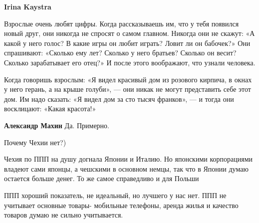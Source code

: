 \begin{itemize}
\begin{itemize}
 
\textbf{Irina Kaystra}

Взрослые очень любят цифры. Когда рассказываешь им, что у тебя появился новый
друг, они никогда не спросят о самом главном. Никогда они не скажут: «А какой у
него голос? В какие игры он любит играть? Ловит ли он бабочек?» Они спрашивают:
«Сколько ему лет? Сколько у него братьев? Сколько он весит? Сколько
зарабатывает его отец?» И после этого воображают, что узнали человека.

Когда говоришь взрослым: «Я видел красивый дом из розового кирпича, в окнах у
него герань, а на крыше голуби», — они никак не могут представить себе этот
дом. Им надо сказать: «Я видел дом за сто тысяч франков», — и тогда они
восклицают: «Какая красота!»


 
\textbf{Александр Махин}
Да.
Примерно.
\end{itemize}

 

Почему Чехии нет?)

Чехия по ППП на душу догнала Японии и Италию. Но японскими корпорациями владеют
сами японцы, а чешскими в основном немцы, так что в Японии думаю остается
больше денег. То же самое справедливо и для Польши

ППП хороший показатель, не идеальный, но лучшего у нас нет. ППП не учитывает
основные товары- мобильные телефоны, аренда жилья и качество товаров думаю не
сильно учитывается.

\begin{itemize}
 

\end{itemize}
\end{itemize}
